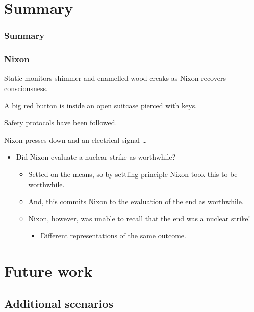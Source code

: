 \documentclass[noamssymb,
graphics,
]{beamer} %
\newcommand{\hozlinedash}[0]{
  \noindent\hdashrule[0.5ex][c]{\textwidth}{.1pt}{2.5pt}
}
\begin{document}
\section{Summary}
\label{sec:summary}


\begin{frame}
  \frametitle{Summary}


\end{frame}


\begin{frame}
  \frametitle{Nixon}

  {\rmfamily
    Static monitors shimmer and enamelled wood creaks as Nixon recovers consciousness.

    A big red button is inside an open suitcase pierced with keys.

    Safety protocols have been followed.

    Nixon presses down and an electrical signal \dots
  }

  \pause
  \hozlinedash

  \begin{itemize}
  \item<+-> Did Nixon evaluate a nuclear strike as worthwhile?
    \begin{itemize}
    \item<+-> Setted on the means, so by settling principle Nixon took this to be worthwhile.
    \item<+-> And, this commits Nixon to the evaluation of the end as worthwhile.
    \item<+-> Nixon, however, was unable to recall that the end was a nuclear strike!
      \begin{itemize}
      \item<+-> Different representations of the same outcome.
      \end{itemize}
    \end{itemize}
  \end{itemize}
\end{frame}



\section{Future work}
\label{sec:future-work}




\subsection{Additional scenarios}
\label{sec:final-case}
\end{document}
